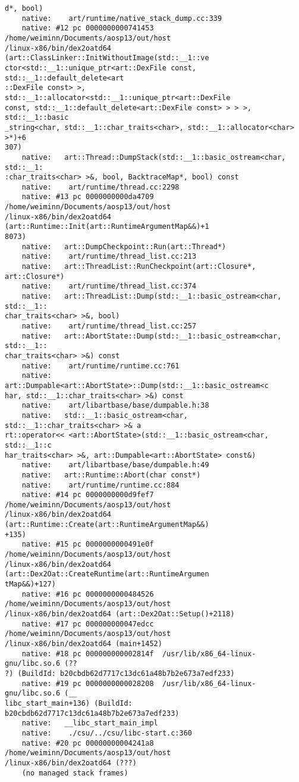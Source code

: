 \begin{lstlisting}
d*, bool)
    native:    art/runtime/native_stack_dump.cc:339
    native: #12 pc 0000000000741453  /home/weiminn/Documents/aosp13/out/host
/linux-x86/bin/dex2oatd64 (art::ClassLinker::InitWithoutImage(std::__1::ve
ctor<std::__1::unique_ptr<art::DexFile const, std::__1::default_delete<art
::DexFile const> >, std::__1::allocator<std::__1::unique_ptr<art::DexFile 
const, std::__1::default_delete<art::DexFile const> > > >, std::__1::basic
_string<char, std::__1::char_traits<char>, std::__1::allocator<char> >*)+6
307)
    native:   art::Thread::DumpStack(std::__1::basic_ostream<char, std::__1:
:char_traits<char> >&, bool, BacktraceMap*, bool) const
    native:    art/runtime/thread.cc:2298
    native: #13 pc 0000000000da4709  /home/weiminn/Documents/aosp13/out/host
/linux-x86/bin/dex2oatd64 (art::Runtime::Init(art::RuntimeArgumentMap&&)+1
8073)
    native:   art::DumpCheckpoint::Run(art::Thread*)
    native:    art/runtime/thread_list.cc:213
    native:   art::ThreadList::RunCheckpoint(art::Closure*, art::Closure*)
    native:    art/runtime/thread_list.cc:374
    native:   art::ThreadList::Dump(std::__1::basic_ostream<char, std::__1::
char_traits<char> >&, bool)
    native:    art/runtime/thread_list.cc:257
    native:   art::AbortState::Dump(std::__1::basic_ostream<char, std::__1::
char_traits<char> >&) const
    native:    art/runtime/runtime.cc:761
    native:   art::Dumpable<art::AbortState>::Dump(std::__1::basic_ostream<c
har, std::__1::char_traits<char> >&) const
    native:    art/libartbase/base/dumpable.h:38
    native:   std::__1::basic_ostream<char, std::__1::char_traits<char> >& a
rt::operator<< <art::AbortState>(std::__1::basic_ostream<char, std::__1::c
har_traits<char> >&, art::Dumpable<art::AbortState> const&)
    native:    art/libartbase/base/dumpable.h:49
    native:   art::Runtime::Abort(char const*)
    native:    art/runtime/runtime.cc:884
    native: #14 pc 0000000000d9fef7  /home/weiminn/Documents/aosp13/out/host
/linux-x86/bin/dex2oatd64 (art::Runtime::Create(art::RuntimeArgumentMap&&)
+135)
    native: #15 pc 0000000000491e0f  /home/weiminn/Documents/aosp13/out/host
/linux-x86/bin/dex2oatd64 (art::Dex2Oat::CreateRuntime(art::RuntimeArgumen
tMap&&)+127)
    native: #16 pc 0000000000484526  /home/weiminn/Documents/aosp13/out/host
/linux-x86/bin/dex2oatd64 (art::Dex2Oat::Setup()+2118)
    native: #17 pc 000000000047edcc  /home/weiminn/Documents/aosp13/out/host
/linux-x86/bin/dex2oatd64 (main+1452)
    native: #18 pc 000000000002814f  /usr/lib/x86_64-linux-gnu/libc.so.6 (??
?) (BuildId: b20cbdb62d7717c13dc61a48b7b2e673a7edf233)
    native: #19 pc 0000000000028208  /usr/lib/x86_64-linux-gnu/libc.so.6 (__
libc_start_main+136) (BuildId: b20cbdb62d7717c13dc61a48b7b2e673a7edf233)
    native:   __libc_start_main_impl
    native:    ./csu/../csu/libc-start.c:360
    native: #20 pc 00000000004241a8  /home/weiminn/Documents/aosp13/out/host
/linux-x86/bin/dex2oatd64 (???)
    (no managed stack frames)


\end{lstlisting}
